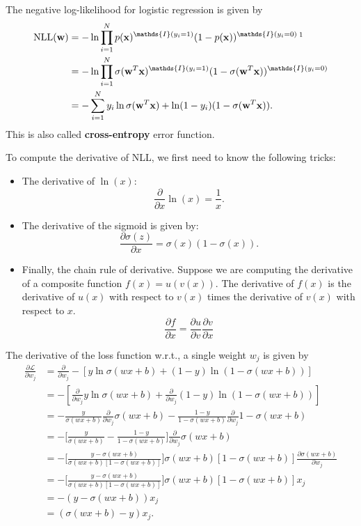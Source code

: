 The negative log-likelihood for logistic regression is given by
\begin{align*}
	\textrm{NLL}(\mathbf{w}) &= -\ln \prod_{i=1}^N p(\rvx)^{\mathds{I}(y_i=1)}(1-p(\rvx))^{\mathds{I}(y_i=0)}\,\footnotemark\\
							 &= -\ln \prod_{i=1}^N \sigma(\mathbf{w}^T\rvx)^{\mathds{I}(y_i=1)}(1-\sigma(\mathbf{w}^T\rvx))^{\mathds{I}(y_i=0)}\\
							 &= -\sum_{i=1}^N y_i\ln\sigma(\mathbf{w}^T\rvx)+\ln(1-y_i)(1-\sigma(\mathbf{w}^T\rvx)).
\end{align*}
This is also called \textbf{cross-entropy} error function. 

To compute the derivative of NLL, we first need to know the following tricks:
\begin{itemize}
	\item The derivative of $\ln (x)$:
$$\frac{\partial }{\partial x}\ln (x) = \frac{1}{x}.$$
\item The derivative of the sigmoid is given by:
$$\frac{\partial \sigma(z)}{\partial x} = \sigma(x)(1-\sigma(x)).$$
\item Finally, the chain rule of derivative. Suppose we are computing the derivative of a composite function $f(x) = u(v(x))$. The derivative of $f(x)$ is the derivative of $u(x)$ with respect to $v(x)$ times the derivative of $v(x)$ with respect to $x$.
$$\frac{\partial f}{\partial x} = \frac{\partial u}{\partial v} \frac{\partial v}{\partial x}$$
\end{itemize}
The derivative of the loss function w.r.t., a single weight $w_j$ is given by
\begin{align*}
	\frac{\partial \mathcal{L}}{\partial w_j} &= \frac{\partial }{\partial w_j} -[y\ln \sigma(wx + b)+(1-y) \ln (1-\sigma(wx+b))]\\
											  &=  -[\frac{\partial }{\partial w_j}y\ln \sigma(wx + b)+\frac{\partial }{\partial w_j}(1-y) \ln (1-\sigma(wx+b))]\\
											  &= -\frac{y}{\sigma(wx + b)}\frac{\partial }{\partial w_j}\sigma(wx + b) - \frac{1-y}{1-\sigma(wx+b)} \frac{\partial }{\partial w_j}1-\sigma(wx+b)\\
											  &= -\bigg[\frac{y}{\sigma(wx + b)}-\frac{1-y}{1-\sigma(wx + b)}\bigg]\frac{\partial }{\partial w_j}\sigma(wx + b)\\
											  &= -\bigg[\frac{y-\sigma(wx + b)}{\sigma(wx + b)[1-\sigma(wx + b)]}\bigg]\sigma(wx + b)[1-\sigma(wx + b)]\frac{\partial \sigma(wx + b)}{\partial w_j}\\
											  &= -\bigg[\frac{y-\sigma(wx + b)}{\sigma(wx + b)[1-\sigma(wx + b)]}\bigg]\sigma(wx + b)[1-\sigma(wx + b)]x_j\\ 
											  &= -( y-\sigma(wx + b) )x_j\\
											  &= ( \sigma(wx + b)-y )x_j.
\end{align*}

